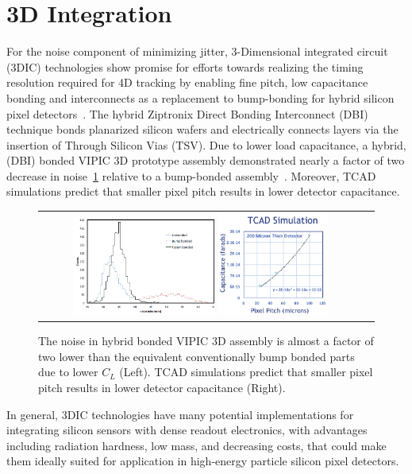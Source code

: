\section{3D Integration}
For the noise component of minimizing jitter, 3-Dimensional integrated circuit (3DIC) technologies show promise for efforts towards realizing the timing resolution required for 4D tracking by enabling fine pitch, low capacitance bonding and interconnects as a replacement to bump-bonding for hybrid silicon pixel detectors~\cite{7167712,7027258}. 
The hybrid Ziptronix Direct Bonding Interconnect (DBI) technique bonds planarized silicon wafers and electrically connects layers via the insertion of Through Silicon Vias (TSV). 
Due to lower load capacitance, a hybrid, (DBI) bonded VIPIC 3D prototype assembly demonstrated nearly a factor of two decrease in noise~\ref{FusionBondedNoise_PixelPitchCapacitance} relative to a bump-bonded assembly~\cite{Lipton:2018mqk}.  
Moreover, TCAD simulations predict that smaller pixel pitch results in lower detector capacitance.
\begin{figure}[!h]
  \begin{center}
    \begin{tabular}{cc}
        \includegraphics[width=0.45\textwidth]{fig_FastTiming/FusionBondedNoise.png}
        \includegraphics[width=0.35\textwidth]{fig_FastTiming/PixelPitch_Capacitance.png}
    \end{tabular}
    \caption{The noise in hybrid bonded VIPIC 3D assembly is almost a factor of two lower than the equivalent conventionally bump bonded parts due to lower $C_L$ (Left).
            TCAD simulations predict that smaller pixel pitch results in lower detector capacitance (Right).
            }            
    \label{FusionBondedNoise_PixelPitchCapacitance}
  \end{center}
\end{figure}
In general, 3DIC technologies have many potential implementations for integrating silicon sensors with dense readout electronics, with advantages including radiation hardness, low mass, and decreasing costs, that could make them ideally suited for application in high-energy particle silicon pixel detectors.

